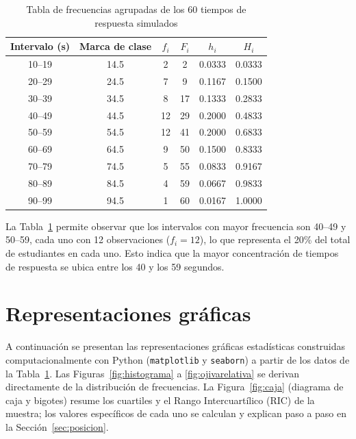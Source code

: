 \documentclass[12pt,letterpaper]{article}
\begin{document}
\begin{table}[H]
\centering
\caption{Tabla de frecuencias agrupadas de los 60 tiempos de respuesta simulados}
\label{tab:frecuencias}
\begin{tabular}{cccccc}
\toprule
Intervalo (s) & Marca de clase & $f_i$ & $F_i$ & $h_i$ & $H_i$ \\
\midrule
10--19 & 14.5 & 2  & 2  & 0.0333 & 0.0333 \\
20--29 & 24.5 & 7  & 9  & 0.1167 & 0.1500 \\
30--39 & 34.5 & 8  & 17 & 0.1333 & 0.2833 \\
40--49 & 44.5 & 12 & 29 & 0.2000 & 0.4833 \\
50--59 & 54.5 & 12 & 41 & 0.2000 & 0.6833 \\
60--69 & 64.5 & 9  & 50 & 0.1500 & 0.8333 \\
70--79 & 74.5 & 5  & 55 & 0.0833 & 0.9167 \\
80--89 & 84.5 & 4  & 59 & 0.0667 & 0.9833 \\
90--99 & 94.5 & 1  & 60 & 0.0167 & 1.0000 \\
\bottomrule
\end{tabular}
\end{table}

La Tabla~\ref{tab:frecuencias} permite observar que los intervalos con mayor frecuencia son 40--49 y 50--59, cada uno con 12 observaciones ($f_i = 12$), lo que representa el 20\% del total de estudiantes en cada uno. Esto indica que la mayor concentración de tiempos de respuesta se ubica entre los 40 y los 59 segundos.

\section{Representaciones gráficas}

A continuación se presentan las representaciones gráficas estadísticas construidas computacionalmente con Python (\texttt{matplotlib} y \texttt{seaborn}) a partir de los datos de la Tabla~\ref{tab:frecuencias}. Las Figuras~\ref{fig:histograma} a \ref{fig:ojivarelativa} se derivan directamente de la distribución de frecuencias. La Figura~\ref{fig:caja} (diagrama de caja y bigotes) resume los cuartiles y el Rango Intercuartílico (RIC) de la muestra; los valores específicos de cada uno se calculan y explican paso a paso en la Sección~\ref{sec:posicion}.
\end{document}
